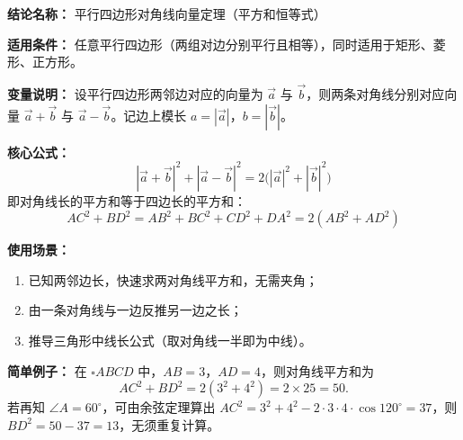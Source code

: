 \textbf{结论名称：} 平行四边形对角线向量定理（平方和恒等式）

\textbf{适用条件：} 任意平行四边形（两组对边分别平行且相等），同时适用于矩形、菱形、正方形。

\textbf{变量说明：} 设平行四边形两邻边对应的向量为 $\vec{a}$ 与 $\vec{b}$，则两条对角线分别对应向量 $\vec{a}+\vec{b}$ 与 $\vec{a}-\vec{b}$。记边上模长 $a=|\vec{a}|$，$b=|\vec{b}|$。

\textbf{核心公式：} 
\[
\boxed{|\vec{a}+\vec{b}|^{2} + |\vec{a}-\vec{b}|^{2} = 2\bigl(|\vec{a}|^{2} + |\vec{b}|^{2}\bigr)}
\]
即对角线长的平方和等于四边长的平方和：
\[
AC^{2} + BD^{2} = AB^{2} + BC^{2} + CD^{2} + DA^{2} = 2(AB^{2} + AD^{2})
\]

\textbf{使用场景：}
\begin{enumerate}
\item 已知两邻边长，快速求两对角线平方和，无需夹角；
\item 由一条对角线与一边反推另一边之长；
\item 推导三角形中线长公式（取对角线一半即为中线）。
\end{enumerate}

\textbf{简单例子：} 
在 $\square ABCD$ 中，$AB=3$，$AD=4$，则对角线平方和为 
\[
AC^{2}+BD^{2}=2(3^{2}+4^{2})=2\times 25=50.
\]
若再知 $\angle A=60^{\circ}$，可由余弦定理算出 $AC^{2}=3^{2}+4^{2}-2\cdot3\cdot4\cdot\cos120^{\circ}=37$，则 $BD^{2}=50-37=13$，无须重复计算。